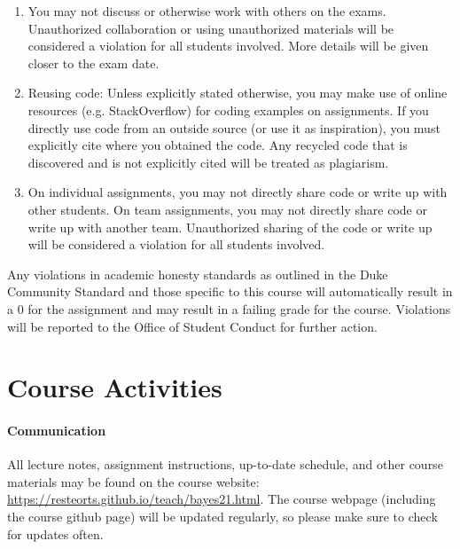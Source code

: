 \documentclass[11pt]{article}
\begin{document}
\begin{enumerate}
\item You may not discuss or otherwise work with others on the exams. Unauthorized collaboration or using unauthorized materials will be considered a violation for all students involved. More details will be given closer to the exam date.
\item Reusing code: Unless explicitly stated otherwise, you may make use of online resources (e.g. StackOverflow) for coding examples on assignments. If you directly use code from an outside source (or use it as inspiration), you must explicitly cite where you obtained the code. Any recycled code that is discovered and is not explicitly cited will be treated as plagiarism.
\item On individual assignments, you may not directly share code or write up with other students. On team assignments, you may not directly share code or write up with another team. Unauthorized sharing of the code or write up will be considered a violation for all students involved.
\end{enumerate}

Any violations in academic honesty standards as outlined in the Duke Community Standard and those specific to this course will automatically result in a 0 for the assignment and may result in a failing grade for the course. Violations will be reported to the Office of Student Conduct for further action.















\section{Course Activities}

\paragraph{Communication} 
All lecture notes, assignment instructions, up-to-date schedule, and other course materials may be found on the course website: \url{https://resteorts.github.io/teach/bayes21.html}. The course webpage (including the course github page) will be updated regularly, so please make sure to check for updates often. \\
\end{document}
